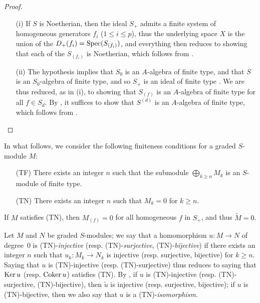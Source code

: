 \begin{proof}
\medskip\noindent
\begin{enumerate}
  \item[{\rm(i)}] If $S$ is Noetherian, then the ideal $S_+$ admits a finite system of homogeneous generators $f_i$ ($1\leq i\leq p$), thus  the underlying space $X$ is the union of the $D_+(f_i)=\operatorname{Spec}(S_{(f_i)})$, and everything then reduces to showing that each of the $S_{(f_i)}$ is Noetherian, which follows from .
  \item[{\rm(ii)}] The hypothesis implies that $S_0$ is an $A$-algebra of finite type, and that $S$ is an $S_0$-algebra of finite type, and so $S_+$ is an ideal of finite type .
    We are thus reduced, as in (i), to showing that $S_{(f)}$ is an $A$-algebra of finite type for all $f\in S_d$.
    By , it suffices to show that $S^{(d)}$ is an $A$-algebra of finite type, which follows from .
\end{enumerate}
\end{proof}

\begin{env}[2.7.2]
\label{II.2.7.2}
In what follows, we consider the following finiteness conditions for a graded $S$-module $M$:
\begin{enumerate}
  \item[{\rm(TF)}] There exists an integer $n$ such that the submodule $\bigoplus_{k\geq n}M_k$ is an $S$-module of finite type.
  \item[{\rm(TN)}] There exists an integer $n$ such that $M_k=0$ for $k\geq n$.
\end{enumerate}

If $M$ satisfies (TN), then $M_{(f)}=0$ for all homogeneous $f$ in $S_+$, and thus $\widetilde{M}=0$.

Let $M$ and $N$ be graded $S$-modules;
we say that a homomorphism $u: M\to N$ of degree~$0$ is (TN)-\emph{injective} (resp. (TN)-\emph{surjective}, (TN)-\emph{bijective}) if there exists an integer $n$ such that $u_k:M_k\to N_k$ is injective (resp. surjective, bijective) for $k\geq n$.
Saying that $u$ is (TN)-injective (resp. (TN)-surjective) thus reduces to saying that $\operatorname{Ker} u$ (resp. $\operatorname{Coker} u$) satisfies (TN).
By , if $u$ is (TN)-injective (resp. (TN)-surjective, (TN)-bijective), then $\widetilde{u}$ is injective (resp. surjective, bijective);
if $u$ is (TN)-bijective, then we also say that $u$ is a (TN)-\emph{isomorphism}.
\end{env}

